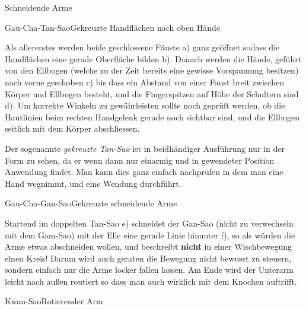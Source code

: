 \begin{WTSatz}{Schneidende Arme}%


	\begin{WTSatzTeil}{Gau-Cha-Tan-Sao}{Gekreuzte Handfl\"achen nach oben H\"ande}
		
		Als allererstes werden beide geschlossene F\"auste a) ganz ge\"offnet sodass die Handfl\"achen eine gerade Oberfl\"ache bilden b). Danach werden die H\"ande, gef\"uhrt von den Ellbogen (welche zu der Zeit bereits eine gewisse Vorspannung besitzen) nach vorne geschoben c) bis dass ein Abstand von einer Faust breit zwischen K\"orper und Ellbogen besteht, und die Fingerspitzen auf H\"ohe der Schultern sind d). Um korrekte Winkeln zu gew\"ahrleisten sollte noch gepr\"uft werden, ob die Hautlinien beim rechten Handgelenk gerade noch sichtbar sind, und die Ellbogen seitlich mit dem K\"orper abschliessen.
		
		Der sogenannte \textit{gekreuzte Tan-Sao} ist in beidh\"andiger Ausf\"uhrung nur in der Form zu sehen, da er wenn dann nur einarmig und in gewendeter Position Anwendung findet. Man kann dies ganz einfach nachpr\"ufen in dem man eine Hand wegnimmt, und eine Wendung durchf\"uhrt.
		
	\end{WTSatzTeil}
	
	\begin{WTSatzTeil}{Gau-Cha-Gan-Sao}{Gekreuzte schneidende Arme}
		
		Startend im doppelten Tan-Sao e) schneidet der Gan-Sao (nicht zu verwechseln mit dem Gam-Sao) mit der Elle eine gerade Linie hinunter f), so als w\"urden die Arme etwas abschneiden wollen, und beschreibt \textbf{nicht} in einer Wischbewegung einen Kreis! Darum wird auch geraten die Bewegung nicht bewusst zu steuern, sondern einfach nur die Arme locker fallen lassen. Am Ende wird der Unterarm leicht nach au{\ss}en routiert so dass man auch wirklich mit dem Knochen auftrifft.
	\end{WTSatzTeil}
	
	\begin{WTSatzTeil}{Kwan-Sao}{Rotierender Arm}
		

\end{WTSatzTeil}
\end{WTSatz}
